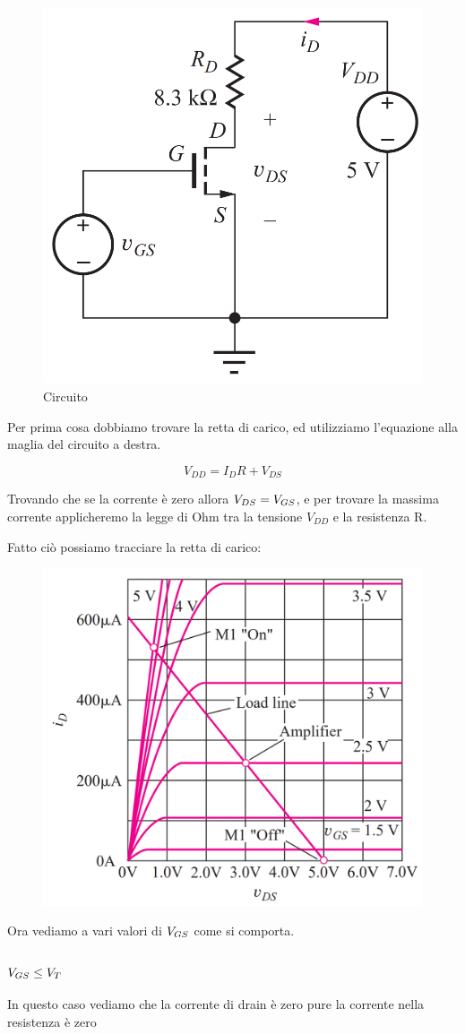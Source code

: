 \begin{figure}[htbp]
    \centering
    \includegraphics[width=0.3\linewidth]{img/calcolo_retta_carico.png}
    \caption{Circuito}    
\end{figure}

Per prima cosa dobbiamo trovare la retta di carico, ed utilizziamo l'equazione alla maglia del circuito a destra.

\begin{equation*}
    V_{DD} = I_DR + V_{DS}
\end{equation*}

Trovando che se la corrente è zero allora $V_{DS} = V_{GS}$, e per trovare la massima corrente applicheremo la legge di Ohm tra la tensione $V_{DD}$ e la resistenza R.

Fatto ciò possiamo tracciare la retta di carico:

\begin{figure}[htbp]
    \centering
    \includegraphics[width=0.5\linewidth]{img/retta_carico_es.png}    
\end{figure}

\newpage

Ora vediamo a vari valori di $V_{GS}$ come si comporta.

\subsubsection{$V_{GS} \leq V_{T}$}

In questo caso vediamo che la corrente di drain è zero pure la corrente nella resistenza è zero

